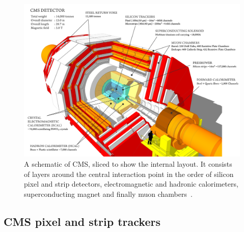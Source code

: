 \begin{figure}[htpb]
	\centering
	\includegraphics[width=\linewidth]{Figures/CMSPicture}
	\caption[A schematic of CMS, sliced to show the internal layout. It consists of layers around the central interaction point in the order of silicon pixel and strip detectors, electromagnetic and hadronic calorimeters, superconducting magnet and finally muon chambers. ]{A schematic of CMS, sliced to show the internal layout. It consists of layers around the central interaction point in the order of silicon pixel and strip detectors, electromagnetic and hadronic calorimeters, superconducting magnet and finally muon chambers~\cite{CMSPicture}.}
	\label{fig:CMSPicture}
\end{figure}

\subsection{CMS pixel and strip trackers}
\label{ssec:Tracker}

